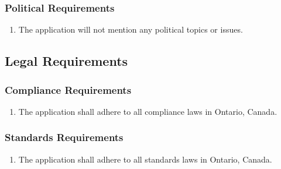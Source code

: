 \documentclass[12pt, titlepage]{article}
\begin{document}
\subsubsection{Political Requirements}
\label{ssub:political_requirements}
\begin{enumerate}[{CP}1. ]
	\item The application will not mention any political topics or issues.
\end{enumerate}


\subsection{Legal Requirements}
\label{sub:legal_requirements}

\subsubsection{Compliance Requirements}
\label{ssub:compliance_requirements}
\begin{enumerate}[{LR}1. ]
	\item The application shall adhere to all compliance laws in Ontario, Canada.
\end{enumerate}

\subsubsection{Standards Requirements}
\label{ssub:standards_requirements}
\begin{enumerate}[{LR}1. ]
	\item The application shall adhere to all standards laws in Ontario, Canada.
\end{enumerate}


\end{document}
